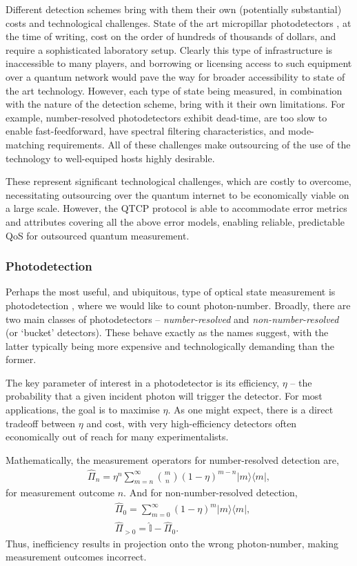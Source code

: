 \documentclass[aps,rmp,twocolumn,amsmath,amssymb,nofootinbib,superscriptaddress]{revtex4}
\newcommand{\bra}[1]{\langle#1|}
\newcommand{\ket}[1]{|#1\rangle}
\begin{document}
Different detection schemes bring with them their own (potentially substantial) costs and technological challenges. State of the art micropillar photodetectors \cite{???}, at the time of writing, cost on the order of hundreds of thousands of dollars, and require a sophisticated laboratory setup. Clearly this type of infrastructure is inaccessible to many players, and borrowing or licensing access to such equipment over a quantum network would pave the way for broader accessibility to state of the art technology. However, each type of state being measured, in combination with the nature of the detection scheme, bring with it their own limitations. For example, number-resolved photodetectors exhibit dead-time, are too slow to enable fast-feedforward, have spectral filtering characteristics, and mode-matching requirements. All of these challenges make outsourcing of the use of the technology to well-equiped hosts highly desirable.

These represent significant technological challenges, which are costly to overcome, necessitating outsourcing over the quantum internet to be economically viable on a large scale. However, the QTCP protocol is able to accommodate error metrics and attributes covering all the above error models, enabling reliable, predictable QoS for outsourced quantum measurement.

%
%

\subsubsection{Photodetection}

Perhaps the most useful, and ubiquitous, type of optical state measurement is photodetection \cite{RohdePDReview}, where we would like to count photon-number. Broadly, there are two main classes of photodetectors -- \emph{number-resolved} and \emph{non-number-resolved} (or `bucket' detectors). These behave exactly as the names suggest, with the latter typically being more expensive and technologically demanding than the former.

The key parameter of interest in a photodetector is its efficiency, $\eta$ -- the probability that a given incident photon will trigger the detector. For most applications, the goal is to maximise $\eta$. As one might expect, there is a direct tradeoff between $\eta$ and cost, with very high-efficiency detectors often economically out of reach for many experimentalists.

Mathematically, the measurement operators for number-resolved detection are,
\begin{align}
\hat\Pi_n = \eta^{n} \sum_{m=n}^\infty \binom{m}{n} (1-\eta)^{m-n} \ket{m}\bra{m},
\end{align}
for measurement outcome $n$. And for non-number-resolved detection,
\begin{align}
&\hat\Pi_0 = \sum_{m=0}^\infty (1-\eta)^{m} \ket{m}\bra{m}, \nonumber \\
&\hat\Pi_{>0} = \mathbb{\hat{I}} - \hat\Pi_0.
\end{align}
Thus, inefficiency results in projection onto the wrong photon-number, making measurement outcomes incorrect.
\end{document}
